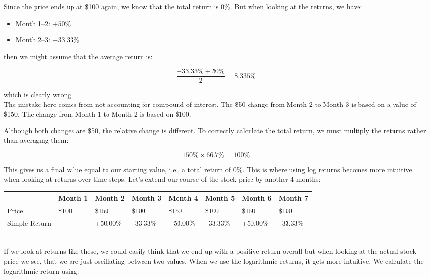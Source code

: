 \documentclass[a4paper,12pt]{report}
\begin{document}
Since the price ends up at \$100 again, we know that the total return is $0\%$. But when looking at the returns, we have:

\begin{itemize}
  \item Month 1–2: $+50\%$
  \item Month 2–3: $-33.33\%$
\end{itemize}

then we might assume that the average return is:

\[
\frac{-33.33\% + 50\%}{2} = 8.335\%
\]

which is clearly wrong.\\
The mistake here comes from not accounting for compound of interest. The \$50 change from Month 2 to Month 3 is based on a value of \$150. The change from Month 1 to Month 2 is based on \$100. 

Although both changes are \$50, the relative change is different. To correctly calculate the total return, we must multiply the returns rather than averaging them:

\[
150\% \times 66.7\% = 100\%
\]

This gives us a final value equal to our starting value, i.e., a total return of $0\%$. This is where using log returns becomes more intuitive when looking at returns over time steps. Let’s extend our course of the stock price by another 4 months:\\

\begin{tabularx}{\textwidth}{@{}l*{7}{>{\centering\arraybackslash}X}@{}}
\toprule
             & Month 1 & Month 2 & Month 3 & Month 4 & Month 5 & Month 6 & Month 7 \\
\midrule
Price        & \$100   & \$150   & \$100   & \$150   & \$100   & \$150   & \$100   \\
Simple Return & –      & +50.00\% & –33.33\% & +50.00\% & –33.33\% & +50.00\% & –33.33\% \\
\bottomrule
\end{tabularx}\\


If we look at returns like these, we could easily think that we end up with a positive return overall but when looking at the actual stock price we see, that we are just oscillating between two values. When we use the logarithmic returns, it gets more intuitive. We calculate the logarithmic return using: \cite{17}\\
\end{document}
